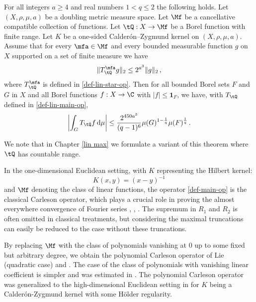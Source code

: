 \begin{theorem}
\label{linearised-metric-Carleson}
    For all integers $a \ge 4$ and real numbers $1<q\le 2$
    the following holds.
    Let $(X,\rho,\mu,a)$ be a doubling metric measure space. Let $\Mf$ be a
    cancellative compatible collection of functions.
    Let $\tQ:X\to \Mf$ be a Borel function with finite range.
    Let $K$ be a one-sided Calder\'on--Zygmund kernel on $(X,\rho,\mu,a)$. Assume that for every $\mfa\in \Mf$ and every bounded measurable function $g$ on $X$ supported on a set of finite measure we have
    \begin{equation}\label{linnontanbound}
        \|T_{\tQ}^\mfa g\|_{2} \leq 2^{a^3} \|g\|_2\,,
    \end{equation}
    where $T_{\tQ}^\mfa$ is defined in \eqref{def-lin-star-op}.
    Then for all bounded Borel sets $F$ and $G$ in $X$ and
    all Borel functions $f:X\to \C$ with
    $|f|\le \mathbf{1}_F$, we have, with $T_\tQ$ defined in \eqref{def-lin-main-op},
    \begin{equation}
        \label{linresweak}
        \left|\int_{G} T_\tQ f \, \mathrm{d}\mu\right| \leq \frac{2^{450a^3}}{(q-1)^6} \mu(G)^{1-\frac{1}{q}} \mu(F)^{\frac{1}{q}}\, .
    \end{equation}
\end{theorem}

We note that in Chapter \ref{lin max} we formulate a variant of this theorem where
$\tQ$ has countable range.

In the one-dimensional Euclidean setting, with $K$ representing the Hilbert kernel:
\begin{equation*}
    K(x,y)=(x-y)^{-1}
\end{equation*}
and $\Mf$ denoting the class of linear functions, the operator \eqref{def-main-op} is the classical Carleson operator, which plays a crucial role in proving the almost everywhere convergence of Fourier series \cite{carleson}, \cite{fefferman}, \cite{lacey-thiele}. The supremum in $R_1$ and $R_2$ is often omitted in classical treatments, but considering the maximal truncations can easily be reduced to the case without these truncations.

By replacing $\Mf$ with the class of polynomials vanishing at $0$ up to some fixed but arbitrary degree, we obtain the polynomial Carleson operator of Lie \cite{lie-quadratic} (quadratic case) and \cite{lie-polynomial}. The case of the class of polynomials with vanishing linear coefficient is simpler and was estimated in \cite{stein-wainger}. The polynomial Carleson operator was generalized to the high-dimensional Euclidean setting in \cite{zk-polynomial} for $K$ being a Calder\'on-Zygmund kernel with some H\"older regularity.

